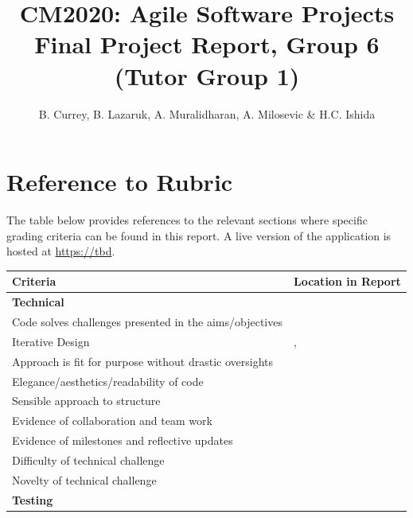 \title{CM2020: Agile Software Projects \\ Final Project Report, Group 6 (Tutor Group 1)}
\author{B. Currey, B. Lazaruk, A. Muralidharan, A. Milosevic \& H.C. Ishida}



\section*{Reference to Rubric}
The table below provides references to the relevant sections where specific grading criteria can be found in this report. A live version of the application is hosted at \url{https://tbd}.

\begin{table}[H]
	\small
	\begin{tabular}{@{}m{10cm}!{\qquad}m{5cm}@{}}
	\toprule
	\textbf{Criteria}                                                & \textbf{Location in Report}     \\ \midrule
	\textbf{Technical}                                               &                                 \\
	Code solves challenges presented in the aims/objectives          &                                 \\
	Iterative Design                                                 &  ,    \\
	Approach is fit for purpose without drastic oversights           &         \\
	Elegance/aesthetics/readability of code                          &                 \\
	Sensible approach to structure                                   &                \\
	Evidence of collaboration and team work                          &               \\
	Evidence of milestones and reflective updates                    &    \\
	Difficulty of technical challenge                                &              \\
	Novelty of technical challenge                                   &       \\
	\textbf{Testing}                                                 &                             \\

\end{tabular}
\end{table}
